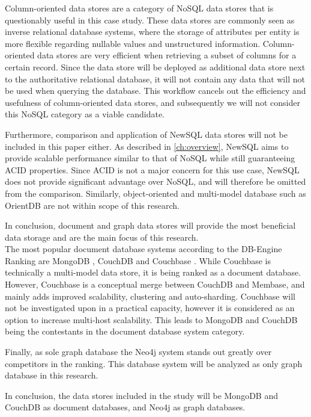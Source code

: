 Column-oriented data stores are a category of NoSQL data stores that is questionably useful in this case study.
These data stores are commonly seen as inverse relational database systems, where the storage of attributes per entity is more flexible regarding nullable values and unstructured information.
Column-oriented data stores are very efficient when retrieving a subset of columns for a certain record.
Since the data store will be deployed as additional data store next to the authoritative relational database, it will not contain any data that will not be used when querying the database.
This workflow cancels out the efficiency and usefulness of column-oriented data stores, and subsequently we will not consider this NoSQL category as a viable candidate.

Furthermore, comparison and application of NewSQL data stores will not be included in this paper either.
As described in \cref{ch:overview}, NewSQL aims to provide scalable performance similar to that of NoSQL while still guaranteeing ACID properties.
Since ACID is not a major concern for this use case, NewSQL does not provide significant advantage over NoSQL, and will therefore be omitted from the comparison.
Similarly, object-oriented and multi-model database such as OrientDB \autocite{OrientDB2010} are not within scope of this research.

In conclusion, document and graph data stores will provide the most beneficial data storage and are the main focus of this research.\\

The most popular document database systems according to the DB-Engine Ranking are MongoDB \autocite{MongoDB2009}, CouchDB \autocite{CouchDB2005} and Couchbase \autocite{Couchbase2010}.
While Couchbase is technically a multi-model data store, it is being ranked as a document database.
However, Couchbase is a conceptual merge between CouchDB and Membase, and mainly adds improved scalability, clustering and auto-sharding.
Couchbase will not be investigated upon in a practical capacity, however it is considered as an option to increase multi-host scalability.
This leads to MongoDB and CouchDB being the contestants in the document database system category.

Finally, as sole graph database the Neo4j system \autocite{Neo4j2007} stands out greatly over competitors in the ranking.
This database system will be analyzed as only graph database in this research.

In conclusion, the data stores included in the study will be MongoDB and CouchDB as document databases, and Neo4j as graph databases.

